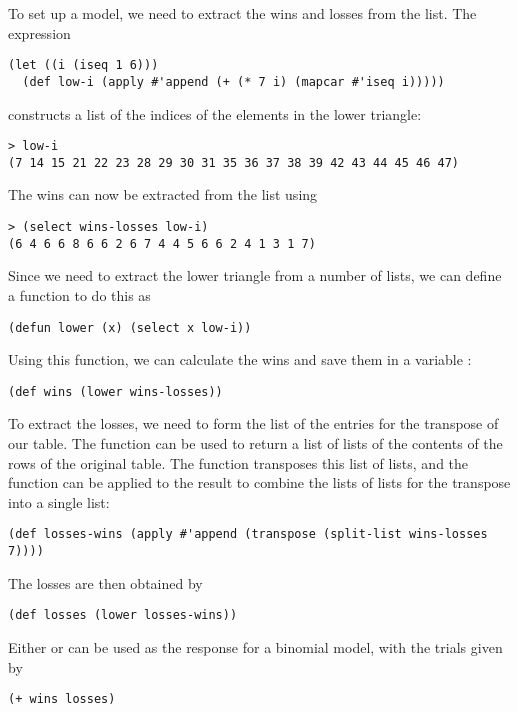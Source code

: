 To set up a model, we need to extract the wins and losses from the
 list. The expression
\begin{verbatim}
(let ((i (iseq 1 6)))
  (def low-i (apply #'append (+ (* 7 i) (mapcar #'iseq i)))))
\end{verbatim}
constructs a list of the indices of the elements in the lower
triangle:
\begin{verbatim}
> low-i
(7 14 15 21 22 23 28 29 30 31 35 36 37 38 39 42 43 44 45 46 47)
\end{verbatim}
The wins can now be extracted from the  list using
\begin{verbatim}
> (select wins-losses low-i)
(6 4 6 6 8 6 6 2 6 7 4 4 5 6 6 2 4 1 3 1 7)
\end{verbatim}
Since we need to extract the lower triangle from a number of lists, we
can define a function to do this as
\begin{verbatim}
(defun lower (x) (select x low-i))
\end{verbatim}
Using this function, we can calculate the wins and save them in a
variable :
\begin{verbatim}
(def wins (lower wins-losses))
\end{verbatim}

To extract the losses, we need to form the list of the entries for the
transpose of our table.  The function  can be used
to return a list of lists of the contents of the rows of the original
table.  The  function transposes this list of lists,
and the  function can be applied to the result to
combine the lists of lists for the transpose into a single list:
\begin{verbatim}
(def losses-wins (apply #'append (transpose (split-list wins-losses 7))))
\end{verbatim}
The losses are then obtained by
\begin{verbatim}
(def losses (lower losses-wins))
\end{verbatim}
Either  or  can be used as the response for
a binomial model, with the trials given by
\begin{verbatim}
(+ wins losses)
\end{verbatim}

